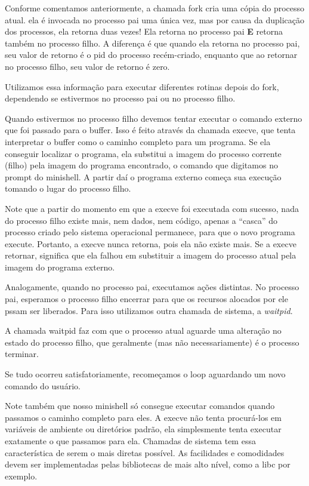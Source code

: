 Conforme comentamos anteriormente, a chamada fork cria uma cópia do processo atual. ela é invocada no processo pai uma única vez, mas por causa da duplicação dos processos, ela retorna duas vezes! Ela retorna no processo pai \textbf{E} retorna também no processo filho. A diferença é que quando ela retorna no processo pai, seu valor de retorno é o pid do processo recém-criado, enquanto que ao retornar no processo filho, seu valor de retorno é zero.

Utilizamos essa informação para executar diferentes rotinas depois do fork, dependendo se estivermos no processo pai ou no processo filho.

Quando estivermos no processo filho devemos tentar executar o comando externo que foi passado para o buffer. Isso é feito através da chamada execve, que tenta interpretar o buffer como o caminho completo para um programa. Se ela conseguir localizar o programa, ela substitui a imagem do processo corrente (filho) pela imagem do programa encontrado, o comando que digitamos no prompt do minishell. A partir daí o programa externo começa sua execução tomando o lugar do processo filho.

Note que a partir do momento em que a execve foi executada com sucesso, nada do processo filho existe mais, nem dados, nem código, apenas a ``casca'' do processo criado pelo sistema operacional permanece, para que o novo programa execute. Portanto, a execve nunca retorna, pois ela não existe mais. Se a execve retornar, significa que ela falhou em substituir a imagem do processo atual pela imagem do programa externo.

Analogamente, quando no processo pai, executamos ações distintas. No processo pai, esperamos o processo filho encerrar para que os recursos alocados por ele pssam ser liberados. Para isso utilizamos outra chamada de sistema, a \emph{waitpid}.

A chamada waitpid faz com que o processo atual aguarde uma alteração no estado do processo filho, que geralmente (mas não necessariamente) é o processo terminar.

Se tudo ocorreu satisfatoriamente, recomeçamos o loop aguardando um novo comando do usuário.

Note também que nosso minishell só consegue executar comandos quando passamos o caminho completo para eles. A execve não tenta procurá-los em variáveis de ambiente ou diretórios padrão, ela simplesmente tenta executar exatamente o que passamos para ela. Chamadas de sistema tem essa característica de serem o mais diretas possível. As facilidades e comodidades devem ser implementadas pelas bibliotecas de mais alto nível, como a libc por exemplo.

